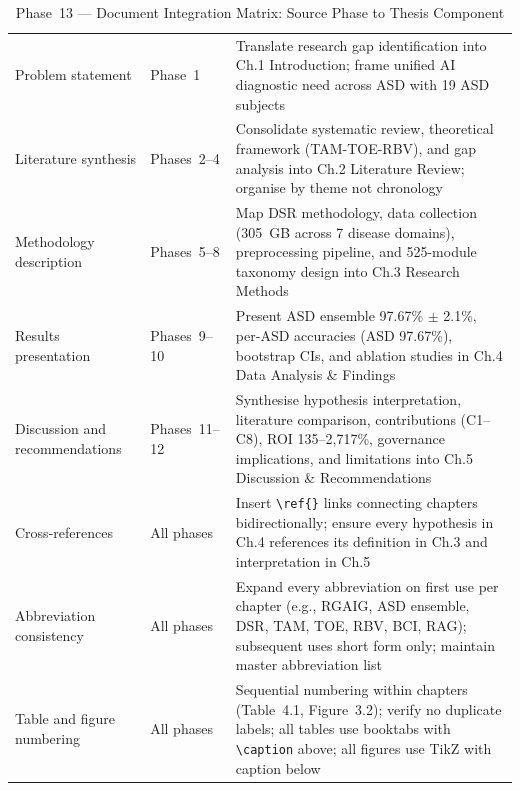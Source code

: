 \begingroup\singlespacing\tablefontsize\tablestripes
\begin{xltabular}{\textwidth}{@{} p{0.17\textwidth} l X @{}}
\caption[Phase~13 --- Document Integration Matrix: Source Phase]{Phase~13 --- Document Integration Matrix: Source Phase to Thesis Component}
\label{tab:phase13_integration}\\
\toprule
{} &  &  \\
\midrule
\endfirsthead
\endhead
\bottomrule
\endlastfoot
Problem statement              & Phase~1          & Translate research gap identification into Ch.1 Introduction; frame unified AI diagnostic need across ASD with 19 ASD subjects \\
\addlinespace
Literature synthesis           & Phases~2--4      & Consolidate systematic review, theoretical framework (TAM-TOE-RBV), and gap analysis into Ch.2 Literature Review; organise by theme not chronology \\
\addlinespace
Methodology description        & Phases~5--8      & Map DSR methodology, data collection (305~GB across 7 disease domains), preprocessing pipeline, and 525-module taxonomy design into Ch.3 Research Methods \\
\addlinespace
Results presentation           & Phases~9--10     & Present ASD ensemble 97.67\% $\pm$ 2.1\%, per-ASD accuracies (ASD 97.67\%), bootstrap CIs, and ablation studies in Ch.4 Data Analysis \& Findings \\
\addlinespace
Discussion and recommendations & Phases~11--12    & Synthesise hypothesis interpretation, literature comparison, contributions (C1--C8), ROI 135--2{,}717\%, governance implications, and limitations into Ch.5 Discussion \& Recommendations \\
\addlinespace
Cross-references               & All phases       & Insert \texttt{\textbackslash ref\{\}} links connecting chapters bidirectionally; ensure every hypothesis in Ch.4 references its definition in Ch.3 and interpretation in Ch.5 \\
\addlinespace
Abbreviation consistency       & All phases       & Expand every abbreviation on first use per chapter (e.g., RGAIG, ASD ensemble, DSR, TAM, TOE, RBV, BCI, RAG); subsequent uses short form only; maintain master abbreviation list \\
\addlinespace
Table and figure numbering     & All phases       & Sequential numbering within chapters (Table~4.1, Figure~3.2); verify no duplicate labels; all tables use booktabs with \texttt{\textbackslash caption} above; all figures use TikZ with caption below \\
\end{xltabular}
\endgroup

